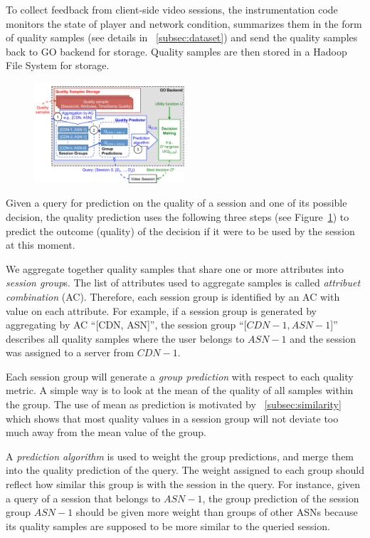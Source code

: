  To collect feedback from client-side video sessions, the instrumentation code monitors the state of player and network condition, summarizes them in the form of quality samples (see details in \Section~\ref{subsec:dataset}) and send the quality samples back to GO backend for storage. Quality samples are then stored in a Hadoop File System for storage. 

\begin{figure}[h!]
\centering
 \includegraphics[width=0.5\textwidth] {figures/backend.pdf}
\label{fig:backend}
\end{figure}

 Given a query for prediction on the quality of a session and one of its possible decision, the quality prediction uses the following three steps (see Figure~\ref{fig:backend}) to predict the outcome (quality) of the decision if it were to be used by the session at this moment.
\begin{packedenumerate}
	\item We aggregate together quality samples that share one or more attributes into {\it session group}s. The list of attributes used to aggregate samples is called {\it attribuet combination} (AC). Therefore, each session group is identified by an AC with value on each attribute. For example, if a session group is generated by aggregating by AC ``[CDN, ASN]'', the session group ``[$CDN-1, ASN-1$]'' describes all quality samples where the user belongs to $ASN-1$ and the session was assigned to a server from $CDN-1$.
	\item Each session group will generate a {\it group prediction} with respect to each quality metric. A simple way is to look at the mean of the quality of all samples within the group. The use of mean as prediction is motivated by  \Section~\ref{subsec:similarity} which shows that most quality values in a session group will not deviate too much away from the mean value of the group.
	\item A {\it prediction algorithm} is used to weight the group predictions, and merge them into the quality prediction of the query. The weight assigned to each group should reflect how similar this group is with the session in the query. For instance, given a query of a session that belongs to $ASN-1$, the group prediction of the session group $ASN-1$ should be given more weight than groups of other ASNs because its quality samples are supposed to be more similar to the queried session.
\end{packedenumerate}

